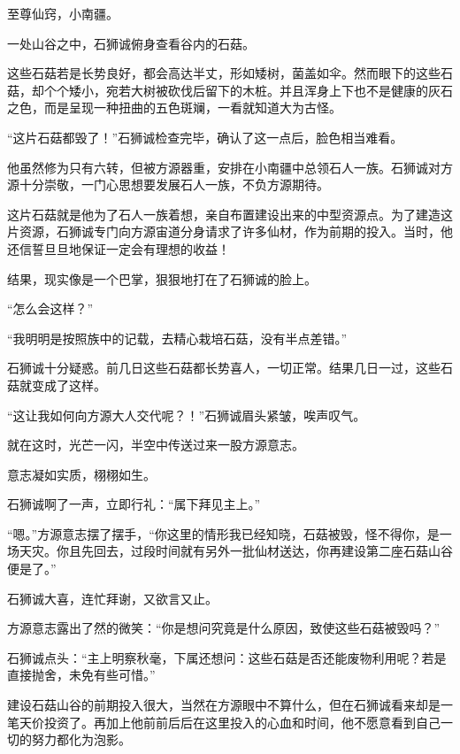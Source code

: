 
\begin{this_body}



至尊仙窍，小南疆。

一处山谷之中，石狮诚俯身查看谷内的石菇。

这些石菇若是长势良好，都会高达半丈，形如矮树，菌盖如伞。然而眼下的这些石菇，却个个矮小，宛若大树被砍伐后留下的木桩。并且浑身上下也不是健康的灰石之色，而是呈现一种扭曲的五色斑斓，一看就知道大为古怪。

“这片石菇都毁了！”石狮诚检查完毕，确认了这一点后，脸色相当难看。

他虽然修为只有六转，但被方源器重，安排在小南疆中总领石人一族。石狮诚对方源十分崇敬，一门心思想要发展石人一族，不负方源期待。

这片石菇就是他为了石人一族着想，亲自布置建设出来的中型资源点。为了建造这片资源，石狮诚专门向方源宙道分身请求了许多仙材，作为前期的投入。当时，他还信誓旦旦地保证一定会有理想的收益！

结果，现实像是一个巴掌，狠狠地打在了石狮诚的脸上。

“怎么会这样？”

“我明明是按照族中的记载，去精心栽培石菇，没有半点差错。”

石狮诚十分疑惑。前几日这些石菇都长势喜人，一切正常。结果几日一过，这些石菇就变成了这样。

“这让我如何向方源大人交代呢？！”石狮诚眉头紧皱，唉声叹气。

就在这时，光芒一闪，半空中传送过来一股方源意志。

意志凝如实质，栩栩如生。

石狮诚啊了一声，立即行礼：“属下拜见主上。”

“嗯。”方源意志摆了摆手，“你这里的情形我已经知晓，石菇被毁，怪不得你，是一场天灾。你且先回去，过段时间就有另外一批仙材送达，你再建设第二座石菇山谷便是了。”

石狮诚大喜，连忙拜谢，又欲言又止。

方源意志露出了然的微笑：“你是想问究竟是什么原因，致使这些石菇被毁吗？”

石狮诚点头：“主上明察秋毫，下属还想问：这些石菇是否还能废物利用呢？若是直接抛舍，未免有些可惜。”

建设石菇山谷的前期投入很大，当然在方源眼中不算什么，但在石狮诚看来却是一笔天价投资了。再加上他前前后后在这里投入的心血和时间，他不愿意看到自己一切的努力都化为泡影。


\end{this_body}
